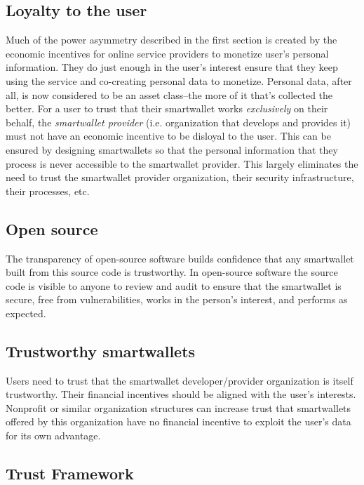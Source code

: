\documentclass[11pt, oneside]{article}   	%
\begin{document}
\subsection{Loyalty to the user}
Much of the power asymmetry described in the first section is created by the economic incentives for online service providers to monetize user's personal information. They do just enough in the user's interest ensure that they keep using the service and co-creating personal data to monetize. Personal data, after all, is now considered to be an asset class--the more of it that's collected the better. For a user to trust that their smartwallet works \emph{exclusively} on their behalf, the \emph{smartwallet provider} (i.e. organization that develops and provides it) must not have an economic incentive to be disloyal to the user. This can be ensured by designing smartwallets so that the personal information that they process is never accessible to the smartwallet provider. This largely eliminates the need to trust the smartwallet provider organization, their security infrastructure, their processes, etc.

\subsection{Open source}

The transparency of open-source software builds confidence that any smartwallet built from this source code is trustworthy. In open-source software the source code is visible to anyone to review and audit to ensure that the smartwallet is secure, free from vulnerabilities, works in the person's interest, and performs as expected.

\subsection{Trustworthy smartwallets}

Users need to trust that the smartwallet developer/provider organization is itself trustworthy. Their financial incentives should be aligned with the user's interests. Nonprofit or similar organization structures can increase trust that smartwallets offered by this organization have no financial incentive to exploit the user's data for its own advantage. 

\subsection{Trust Framework}
\end{document}
